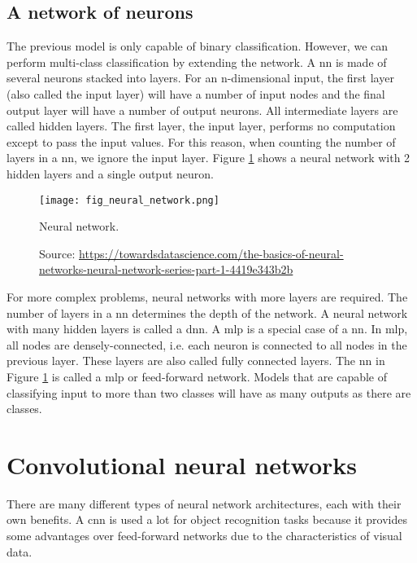 \subsection{A network of neurons}
The previous model is only capable of binary classification. However, we can perform multi-class classification by extending the network. A \acrfull{nn} is made of several neurons stacked into layers. For an n-dimensional input, the first layer (also called the input layer) will have a number of input nodes and the final output layer will have a number of output neurons. All intermediate layers are called hidden layers. The first layer, the input layer, performs no computation except to pass the input values. For this reason, when counting the number of layers in a \acrshort{nn}, we ignore the input layer. Figure \ref{fig:neural_network} shows a neural network with 2 hidden layers and a single output neuron. 
\begin{figure}[ht]
    \begin{center}
    \texttt{[image: fig\_neural\_network.png]}
    \caption[Neural network]{Neural network.}
    \caption*{Source: \href{https://towardsdatascience.com/the-basics-of-neural-networks-neural-network-series-part-1-4419e343b2b}{https://towardsdatascience.com/the-basics-of-neural-networks-neural-network-series-part-1-4419e343b2b}}
    \label{fig:neural_network}
    \end{center}
\end{figure}

For more complex problems, neural networks with more layers are required. The number of layers in a \acrshort{nn} determines the depth of the network. A neural network with many hidden layers is called a \acrfull{dnn}. 
A \acrfull{mlp} \cite{hornik1989multilayer} is a special case of a \acrshort{nn}. In \acrshort{mlp}, all nodes are densely-connected, i.e. each neuron is connected to all nodes in the previous layer. These layers are also called fully connected layers. The \acrshort{nn} in Figure \ref{fig:neural_network} is called a \acrshort{mlp} or feed-forward network. Models that are capable of classifying input to more than two classes will have as many outputs as there are classes.

\section{Convolutional neural networks}
There are many different types of neural network architectures, each with their own benefits. A \acrfull{cnn} is used a lot for object recognition tasks because it provides some advantages over feed-forward networks due to the characteristics of visual data.

